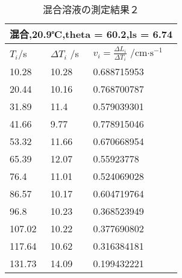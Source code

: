 \documentclass{jsarticle}
\begin{document}
\begin{table}[H]
\centering
\caption{混合溶液の測定結果２}
\label{my-label}
\begin{tabular}{|l|l|l|}
\hline
\multicolumn{3}{|l|}{混合,20.9℃,theta = 60.2,ls = 6.74} \\ \hline
$T_i $/s   & $\Delta T_i $ /s  & $v_i = \frac{\Delta L_i}{\Delta T_i}$ /cm$\cdot \textrm{s}^{-1}$   \\ \hline
10.28           & 10.28         & 0.688715953         \\ \hline
20.44           & 10.16         & 0.768700787         \\ \hline
31.89           & 11.4          & 0.579039301         \\ \hline
41.66           & 9.77          & 0.778915046         \\ \hline
53.32           & 11.66         & 0.670668954         \\ \hline
65.39           & 12.07         & 0.55923778          \\ \hline
76.4            & 11.01         & 0.524069028         \\ \hline
86.57           & 10.17         & 0.604719764         \\ \hline
96.8            & 10.23         & 0.368523949         \\ \hline
107.02          & 10.22         & 0.377690802         \\ \hline
117.64          & 10.62         & 0.316384181         \\ \hline
131.73          & 14.09         & 0.199432221         \\ \hline
\end{tabular}
\end{table}
\end{document}
